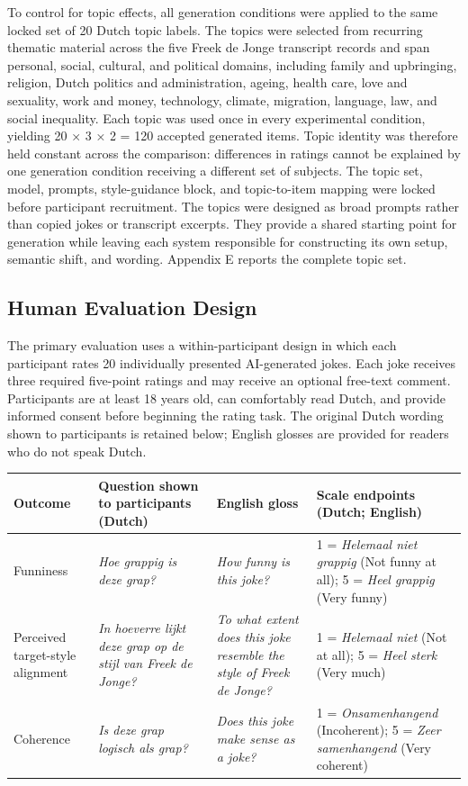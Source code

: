 \documentclass[11pt]{article}
\begin{document}
To control for topic effects, all generation conditions were applied to the same locked set of 20 Dutch topic labels. The topics were selected from recurring thematic material across the five Freek de Jonge transcript records and span personal, social, cultural, and political domains, including family and upbringing, religion, Dutch politics and administration, ageing, health care, love and sexuality, work and money, technology, climate, migration, language, law, and social inequality. Each topic was used once in every experimental condition, yielding 20 × 3 × 2 = 120 accepted generated items. Topic identity was therefore held constant across the comparison: differences in ratings cannot be explained by one generation condition receiving a different set of subjects. The topic set, model, prompts, style-guidance block, and topic-to-item mapping were locked before participant recruitment. The topics were designed as broad prompts rather than copied jokes or transcript excerpts. They provide a shared starting point for generation while leaving each system responsible for constructing its own setup, semantic shift, and wording. Appendix E reports the complete topic set.

\subsection{Human Evaluation Design}\label{human-evaluation-design}

The primary evaluation uses a within-participant design in which each participant rates 20 individually presented AI-generated jokes. Each joke receives three required five-point ratings and may receive an optional free-text comment. Participants are at least 18 years old, can comfortably read Dutch, and provide informed consent before beginning the rating task. The original Dutch wording shown to participants is retained below; English glosses are provided for readers who do not speak Dutch.

\begin{table}[t]\centering\scriptsize\begin{tabularx}{\textwidth}{YYYY}
\toprule\noalign{}
Outcome & Question shown to participants (Dutch) & English gloss & Scale endpoints (Dutch; English) \\
\midrule\noalign{}

\bottomrule\noalign{}

Funniness & \emph{Hoe grappig is deze grap?} & \emph{How funny is this joke?} & 1 = \emph{Helemaal niet grappig} (Not funny at all); 5 = \emph{Heel grappig} (Very funny) \\
Perceived target-style alignment & \emph{In hoeverre lijkt deze grap op de stijl van Freek de Jonge?} & \emph{To what extent does this joke resemble the style of Freek de Jonge?} & 1 = \emph{Helemaal niet} (Not at all); 5 = \emph{Heel sterk} (Very much) \\
Coherence & \emph{Is deze grap logisch als grap?} & \emph{Does this joke make sense as a joke?} & 1 = \emph{Onsamenhangend} (Incoherent); 5 = \emph{Zeer samenhangend} (Very coherent) \\
\end{tabularx}\end{table}
\end{document}
